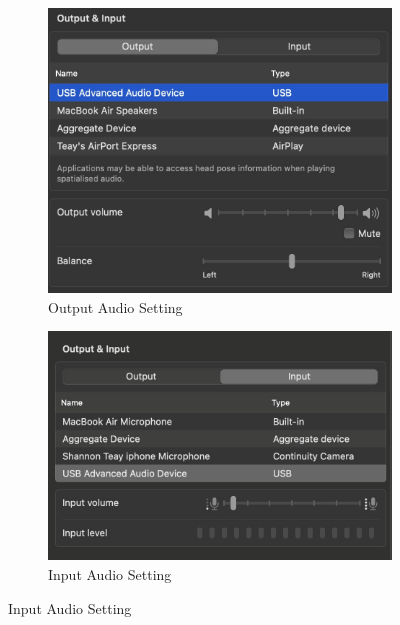 \documentclass[
	a4paper,
	11pt,
]{article}
\begin{document}
\newpage
\begin{figure}
    \centering
        \begin{subfigure}[b]{0.45\textwidth}
        \centering
        \includegraphics[width=\textwidth]{0_img/mac_setting1.jpg}
        \caption[Setting1]%
        {{\small  Output Audio Setting}}    
        \label{fig:mean and std of net14}
    \end{subfigure}
    \hfill
    \centering
        \begin{subfigure}[b]{0.5\textwidth}
        \centering
        \includegraphics[width=\textwidth]{0_img/mac_setting2.jpg}
        \caption[Setting2]%
        {{\small Input Audio Setting}}    
        \label{fig:mean and std of net14}
    \end{subfigure}

\end{figure}
\end{document}
